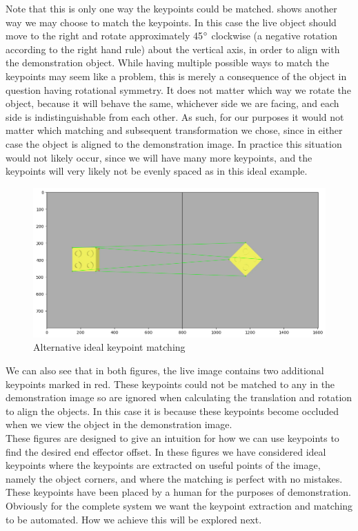 Note that this is only one way the keypoints could be matched.  shows another way we may choose to match the keypoints. In this case the live object should move to the right and rotate approximately 45$\operatorname{^{\circ}}$ clockwise (a negative rotation according to the right hand rule) about the vertical axis, in order to align with the demonstration object. While having multiple possible ways to match the keypoints may seem like a problem, this is merely a consequence of the object in question having rotational symmetry. It does not matter which way we rotate the object, because it will behave the same, whichever side we are facing, and each side is indistinguishable from each other. As such, for our purposes it would not matter which matching and subsequent transformation we chose, since in either case the object is aligned to the demonstration image. In practice this situation would not likely occur, since we will have many more keypoints, and the keypoints will very likely not be evenly spaced as in this ideal example.

\begin{figure}[h]
    \centering
    \includegraphics[width=\textwidth]{figures/ideal_matches_inv.png}
    \caption{Alternative ideal keypoint matching}
    \label{fig:ideal-matches-inv}
\end{figure}

We can also see that in both figures, the live image contains two additional keypoints marked in red. These keypoints could not be matched to any in the demonstration image so are ignored when calculating the translation and rotation to align the objects. In this case it is because these keypoints become occluded when we view the object in the demonstration image.\\

These figures are designed to give an intuition for how we can use keypoints to find the desired end effector offset. In these figures we have considered ideal keypoints where the keypoints are extracted on useful points of the image, namely the object corners, and where the matching is perfect with no mistakes. These keypoints have been placed by a human for the purposes of demonstration. Obviously for the complete system we want the keypoint extraction and matching to be automated. How we achieve this will be explored next.

